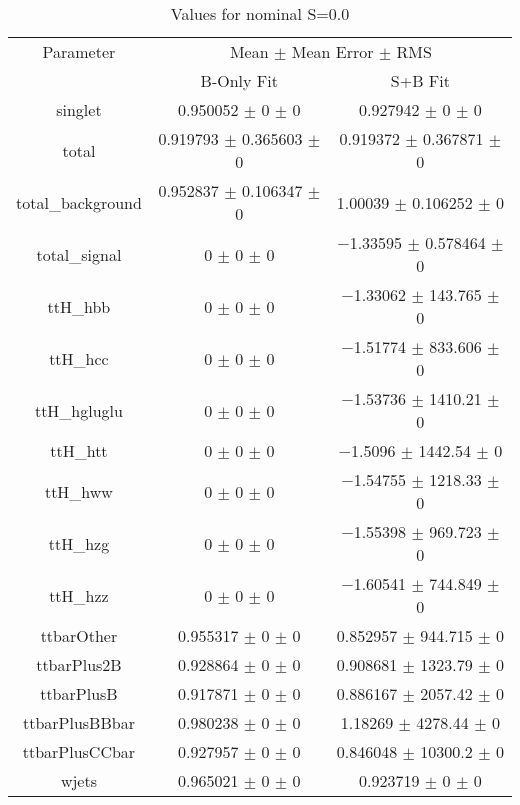 \begin{table}
\centering
\caption{Values for nominal S=0.0}
\begin{tabular}{ccc}
\toprule
Parameter & \multicolumn{2}{c}{Mean $\pm$ Mean Error $\pm$ RMS}\\
 & B-Only Fit & S+B Fit\\
\midrule
singlet & \num{0.950052} $\pm$ \num{0} $\pm$ \num{0} & \num{0.927942} $\pm$ \num{0} $\pm$ \num{0}\\
total & \num{0.919793} $\pm$ \num{0.365603} $\pm$ \num{0} & \num{0.919372} $\pm$ \num{0.367871} $\pm$ \num{0}\\
total\_background & \num{0.952837} $\pm$ \num{0.106347} $\pm$ \num{0} & \num{1.00039} $\pm$ \num{0.106252} $\pm$ \num{0}\\
total\_signal & \num{0} $\pm$ \num{0} $\pm$ \num{0} & \num{-1.33595} $\pm$ \num{0.578464} $\pm$ \num{0}\\
ttH\_hbb & \num{0} $\pm$ \num{0} $\pm$ \num{0} & \num{-1.33062} $\pm$ \num{143.765} $\pm$ \num{0}\\
ttH\_hcc & \num{0} $\pm$ \num{0} $\pm$ \num{0} & \num{-1.51774} $\pm$ \num{833.606} $\pm$ \num{0}\\
ttH\_hgluglu & \num{0} $\pm$ \num{0} $\pm$ \num{0} & \num{-1.53736} $\pm$ \num{1410.21} $\pm$ \num{0}\\
ttH\_htt & \num{0} $\pm$ \num{0} $\pm$ \num{0} & \num{-1.5096} $\pm$ \num{1442.54} $\pm$ \num{0}\\
ttH\_hww & \num{0} $\pm$ \num{0} $\pm$ \num{0} & \num{-1.54755} $\pm$ \num{1218.33} $\pm$ \num{0}\\
ttH\_hzg & \num{0} $\pm$ \num{0} $\pm$ \num{0} & \num{-1.55398} $\pm$ \num{969.723} $\pm$ \num{0}\\
ttH\_hzz & \num{0} $\pm$ \num{0} $\pm$ \num{0} & \num{-1.60541} $\pm$ \num{744.849} $\pm$ \num{0}\\
ttbarOther & \num{0.955317} $\pm$ \num{0} $\pm$ \num{0} & \num{0.852957} $\pm$ \num{944.715} $\pm$ \num{0}\\
ttbarPlus2B & \num{0.928864} $\pm$ \num{0} $\pm$ \num{0} & \num{0.908681} $\pm$ \num{1323.79} $\pm$ \num{0}\\
ttbarPlusB & \num{0.917871} $\pm$ \num{0} $\pm$ \num{0} & \num{0.886167} $\pm$ \num{2057.42} $\pm$ \num{0}\\
ttbarPlusBBbar & \num{0.980238} $\pm$ \num{0} $\pm$ \num{0} & \num{1.18269} $\pm$ \num{4278.44} $\pm$ \num{0}\\
ttbarPlusCCbar & \num{0.927957} $\pm$ \num{0} $\pm$ \num{0} & \num{0.846048} $\pm$ \num{10300.2} $\pm$ \num{0}\\
wjets & \num{0.965021} $\pm$ \num{0} $\pm$ \num{0} & \num{0.923719} $\pm$ \num{0} $\pm$ \num{0}\\
\bottomrule
\end{tabular}
\end{table}